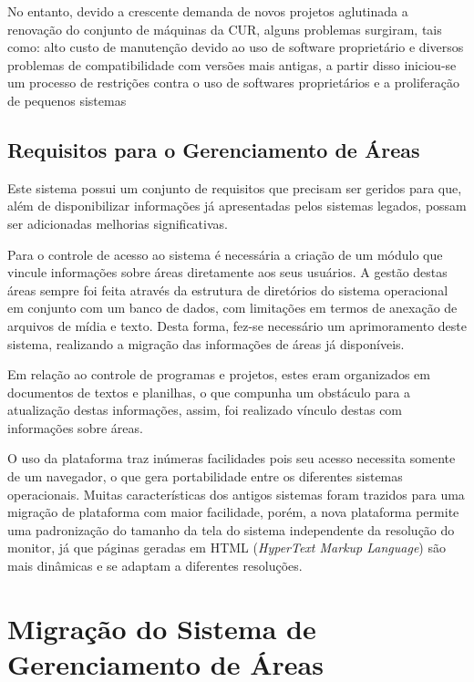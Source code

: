 \documentclass[10pt, twocolumn]{article}
\begin{document}
No entanto, devido a crescente demanda de novos projetos aglutinada a renovação do conjunto de máquinas da CUR, alguns problemas surgiram, tais como: alto custo de manutenção devido ao uso de software proprietário e diversos problemas de compatibilidade com versões mais antigas, a partir disso iniciou-se um processo de restrições contra o uso de softwares proprietários e a proliferação de pequenos sistemas  

\subsection{Requisitos para o Gerenciamento de Áreas}
\label{sect:rga}
Este sistema possui um conjunto de requisitos que precisam ser geridos para que, além de disponibilizar informações já apresentadas pelos sistemas legados, possam ser adicionadas melhorias significativas.

Para o controle de acesso ao sistema é necessária a criação de um módulo que vincule informações sobre áreas diretamente aos seus usuários. A gestão destas áreas sempre foi feita através da estrutura de diretórios do sistema operacional em conjunto com um banco de dados, com limitações em termos de anexação de arquivos de mídia e texto. Desta forma, fez-se necessário um aprimoramento deste sistema, realizando a migração das informações de áreas já disponíveis.

Em relação ao controle de programas e projetos, estes eram organizados em documentos de textos e planilhas, o que compunha um obstáculo para a atualização destas informações, assim, foi realizado vínculo destas com informações sobre áreas.

O uso da plataforma traz inúmeras facilidades pois seu acesso necessita somente de um navegador, o que gera portabilidade entre os diferentes sistemas operacionais. Muitas características dos antigos sistemas foram trazidos para uma migração de plataforma com maior facilidade, porém, a nova plataforma permite uma padronização do tamanho da tela do sistema independente da resolução do monitor, já que páginas geradas em HTML (\textit{HyperText Markup Language}) são mais dinâmicas e se adaptam a diferentes resoluções.

\section{Migração do Sistema de Gerenciamento de Áreas}
\label{sect:msga}
\end{document}
